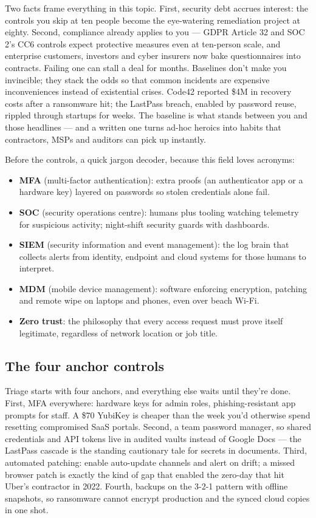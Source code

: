 Two facts frame everything in this topic. First, security debt accrues interest: the controls you skip at ten people become the eye-watering remediation project at eighty. Second, compliance already applies to you — GDPR Article 32 and SOC 2's CC6 controls expect protective measures even at ten-person scale, and enterprise customers, investors and cyber insurers now bake questionnaires into contracts. Failing one can stall a deal for months. Baselines don't make you invincible; they stack the odds so that common incidents are expensive inconveniences instead of existential crises. Code42 reported \$4M in recovery costs after a ransomware hit; the LastPass breach, enabled by password reuse, rippled through startups for weeks. The baseline is what stands between you and those headlines — and a written one turns ad-hoc heroics into habits that contractors, MSPs and auditors can pick up instantly.


Before the controls, a quick jargon decoder, because this field loves acronyms:


\begin{itemize}[leftmargin=*]
\item \textbf{MFA} (multi-factor authentication): extra proofs (an authenticator app or a hardware key) layered on passwords so stolen credentials alone fail.
\item \textbf{SOC} (security operations centre): humans plus tooling watching telemetry for suspicious activity; night-shift security guards with dashboards.
\item \textbf{SIEM} (security information and event management): the log brain that collects alerts from identity, endpoint and cloud systems for those humans to interpret.
\item \textbf{MDM} (mobile device management): software enforcing encryption, patching and remote wipe on laptops and phones, even over beach Wi-Fi.
\item \textbf{Zero trust}: the philosophy that every access request must prove itself legitimate, regardless of network location or job title.
\end{itemize}


\subsection{The four anchor controls}


Triage starts with four anchors, and everything else waits until they're done. First, MFA everywhere: hardware keys for admin roles, phishing-resistant app prompts for staff. A \$70 YubiKey is cheaper than the week you'd otherwise spend resetting compromised SaaS portals. Second, a team password manager, so shared credentials and API tokens live in audited vaults instead of Google Docs — the LastPass cascade is the standing cautionary tale for secrets in documents. Third, automated patching: enable auto-update channels and alert on drift; a missed browser patch is exactly the kind of gap that enabled the zero-day that hit Uber's contractor in 2022. Fourth, backups on the 3-2-1 pattern with offline snapshots, so ransomware cannot encrypt production and the synced cloud copies in one shot.


